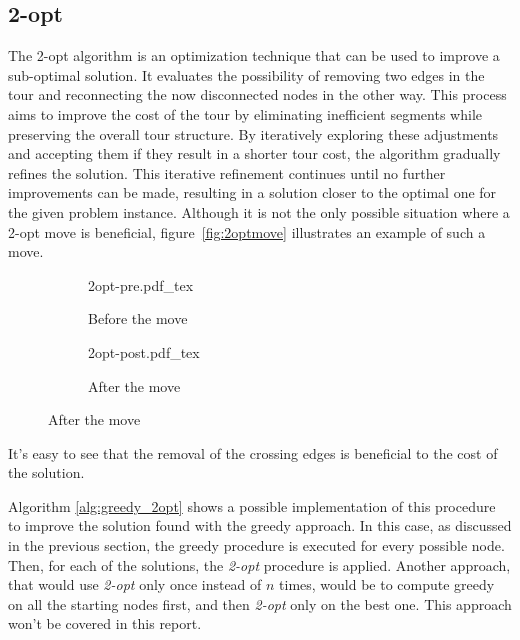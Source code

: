 \documentclass{article}
\begin{document}
\subsection{2-opt}
The 2-opt algorithm is an optimization technique that can be used to improve a sub-optimal solution.
It evaluates the possibility of removing two edges in the tour and reconnecting the now disconnected nodes in the other way.
This process aims to improve the cost of the tour by eliminating inefficient segments while preserving the overall tour structure. By
iteratively exploring these adjustments and accepting them if they result in a shorter tour cost, the algorithm gradually refines
the solution. This iterative refinement continues until no further improvements can be made, resulting in a
solution closer to the optimal one for the given problem instance.
Although it is not the only possible situation where a 2-opt move is
beneficial, figure~\ref{fig:2optmove} illustrates an example of such a move.

\begin{figure}[H]
        \caption{Example of a 2-opt move}
        \label{fig:2optmove}
        \centering
        \begin{subfigure}{.5\textwidth}
                \centering
                \def\svgwidth{.7\linewidth}
                {2opt-pre.pdf_tex}
                \caption{Before the move}
        \end{subfigure}%
        \begin{subfigure}{.5\textwidth}
                \centering
                \def\svgwidth{.7\linewidth}
                {2opt-post.pdf_tex}
                \caption{After the move}
        \end{subfigure}
\end{figure}

It's easy to see that the removal of the crossing edges is beneficial to the
cost of the solution.

Algorithm \ref{alg:greedy_2opt} shows a possible implementation of this procedure to improve
the solution found with the greedy approach. In this case, as discussed in the
previous section, the greedy procedure is executed for every possible node.
Then, for each of the solutions, the \textit{2-opt} procedure is applied.
Another approach, that would use \textit{2-opt} only once instead of $n$ times, would be
to compute greedy on all the starting nodes first, and then \textit{2-opt} only on the
best one. This approach won't be covered in this report.
\end{document}
